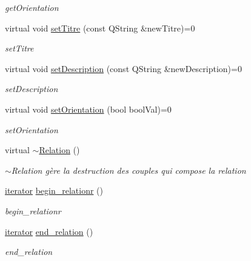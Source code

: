 \begin{DoxyCompactItemize}
\begin{DoxyCompactList}\small\item\em get\+Orientation \end{DoxyCompactList}\item 
virtual void \hyperlink{class_relation_a1c08a802796f5fccaa5732ec1a96e542}{set\+Titre} (const Q\+String \&new\+Titre)=0
\begin{DoxyCompactList}\small\item\em set\+Titre \end{DoxyCompactList}\item 
virtual void \hyperlink{class_relation_a8f698cc45c38a849c4bcd8336fa5e2b3}{set\+Description} (const Q\+String \&new\+Description)=0
\begin{DoxyCompactList}\small\item\em set\+Description \end{DoxyCompactList}\item 
virtual void \hyperlink{class_relation_a708a16e5b0dd280e64832ca1d042cd96}{set\+Orientation} (bool bool\+Val)=0
\begin{DoxyCompactList}\small\item\em set\+Orientation \end{DoxyCompactList}\item 
\mbox{\label{class_relation_aac587ec926df3043c3eedcb5123be50b}} 
virtual \hyperlink{class_relation_aac587ec926df3043c3eedcb5123be50b}{$\sim$\+Relation} ()
\begin{DoxyCompactList}\small\item\em $\sim$\+Relation gère la destruction des couples qui compose la relation \end{DoxyCompactList}\item 
\hyperlink{class_relation_1_1iterator}{iterator} \hyperlink{class_relation_a59d7e086b7a83b3aa7ca7a4a6adf8240}{begin\+\_\+relationr} ()
\begin{DoxyCompactList}\small\item\em begin\+\_\+relationr \end{DoxyCompactList}\item 
\hyperlink{class_relation_1_1iterator}{iterator} \hyperlink{class_relation_a2dca1dae07627e8e470d01fa95a7fb12}{end\+\_\+relation} ()
\begin{DoxyCompactList}\small\item\em end\+\_\+relation \end{DoxyCompactList}\end{DoxyCompactItemize}
